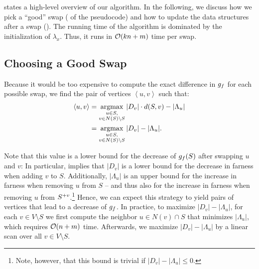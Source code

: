 

 states a high-level overview of our \localswaps
algorithm. In the following, we discuss how we pick a \enquote{good} swap
( of the pseudocode) and how to update the data
structures after a swap ().
The running time of the algorithm is dominated by the initialization of
$\lambda_x$. Thus, it runs in $\mathcal{O}(kn + m)$ time per swap.


\subsection{Choosing a Good Swap}
\label{sec:local-swaps-choosing}
%
Because it would be too expensive to compute the exact difference in $g_f$
for each possible swap, we find the pair of vertices $\left<u, v\right>$ such
that:
%
\begin{align*}
\left<u, v\right> &= \argmax_{\substack{u \in S,\\v\in N(S) \setminus S}}
|D_v|\cdot d(S, v) - |\Lambda_u|\\
                  &= \argmax_{\substack{u \in S,\\v\in N(S) \setminus S}}
                  |D_v| - |\Lambda_u|.
\end{align*}

Note that this value is a lower bound for the decrease of $g_f(S)$ after
swapping $u$ and $v$: In particular,  implies
that $|D_v|$ is a lower bound for the decrease in farness when adding $v$ to
$S$. Additionally, $|\Lambda_u|$ is an upper bound for the increase in farness
when removing $u$ from $S$ -- and thus also for the increase in farness when
removing $u$ from $S^{+v}$.\footnote{Note, however, that this bound is trivial if
$|D_v| - |\Lambda_u| \le 0$.} Hence,
we can expect this strategy to yield pairs of vertices that lead to a decrease
of $g_f$. In practice, to maximize $|D_v| - |\Lambda_u|$, for each $v \in V
\setminus S$ we first compute the neighbor $u \in N(v) \cap S$ that minimizes
$|\Lambda_u|$, which requires $\mathcal{O}(n + m)$ time. Afterwards, we maximize $|D_v| -
|\Lambda_u|$ by a linear scan over all $v \in V \setminus S$.

